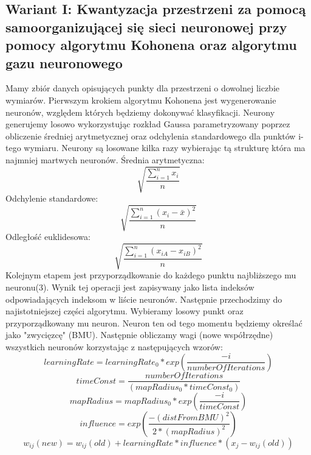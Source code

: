 \documentclass{classrep}
\begin{document}
{{\subsection*{Wariant I: Kwantyzacja przestrzeni za pomocą samoorganizującej się sieci neuronowej przy pomocy algorytmu Kohonena oraz algorytmu gazu neuronowego}
Mamy zbiór danych opisujących punkty dla przestrzeni o dowolnej liczbie wymiarów. Pierwszym krokiem algorytmu Kohonena jest wygenerowanie neuronów, względem których będziemy dokonywać klasyfikacji. Neurony generujemy losowo wykorzystując rozkład Gaussa parametryzowany poprzez obliczenie średniej arytmetycznej oraz odchylenia standardowego dla punktów i-tego wymiaru. Neurony są losowane kilka razy wybierając tą strukturę która ma najmniej martwych neuronów. Średnia arytmetyczna: 
\begin{equation}
\sqrt{\dfrac{\sum_{i=1}^{n} x_i}{n} }
\end{equation}
Odchylenie standardowe:
\begin{equation}
\sqrt{\dfrac{\sum_{i=1}^{n} {(x_i - \bar{x})^2}}{n} }
\end{equation}
Odległość euklidesowa:
\begin{equation}
\sqrt{\dfrac{\sum_{i=1}^{n} {(x_{iA} - x_{iB})^2}}{n} }
\end{equation}
Kolejnym etapem jest przyporządkowanie do każdego punktu najbliższego mu neuronu(3). Wynik tej operacji jest zapisywany jako lista indeksów odpowiadających indeksom w liście neuronów. Następnie przechodzimy do najistotniejszej części algorytmu. Wybieramy losowy punkt oraz przyporządkowany mu neuron. Neuron ten od tego momentu będziemy określać jako "zwycięzcę" (BMU). Następnie obliczamy wagi (nowe współrzędne) wszystkich neuronów korzystając z następujących wzorów: 
\begin{equation}
learningRate=learningRate_0 * exp(\dfrac{-i}{numberOfIterations})
\end{equation}
\begin{equation}
timeConst=\dfrac{numberOfIterations}{(mapRadius_0 * timeConst_0)}
\end{equation}
\begin{equation}
mapRadius=mapRadius_0 * exp(\dfrac{-i}{timeConst})
\end{equation}
\begin{equation}
influence=exp(\dfrac{-(distFromBMU)^2}{2*(mapRadius)^2})
\end{equation}
\begin{equation}
w_{ij}(new)=w_{ij}(old)+learningRate  * influence *  (x_j - w_{ij}(old) )

\end{equation}}}
\end{document}
